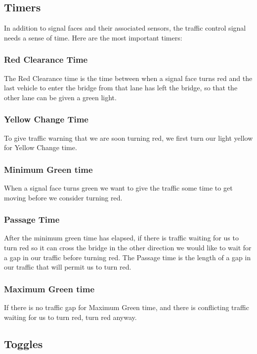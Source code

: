 \documentclass[letterpaper,twoside]{article}
\begin{document}
\subsection{Timers}

In addition to signal faces and their associated sensors, the
traffic control signal needs a sense of time.  Here are the most
important timers:

\subsubsection{Red Clearance Time}
The Red Clearance time is the time between when a signal face turns red
and the last vehicle to enter the bridge from that lane has left the
bridge, so that the other lane can be given a green light.

\subsubsection{Yellow Change Time}
To give traffic warning that we are soon turning red, we first turn our light
yellow for Yellow Change time.

\subsubsection{Minimum Green time}
When a signal face turns green we want to give the traffic some time
to get moving before we consider turning red.

\subsubsection{Passage Time}
After the minimum green time has elapsed, if there is traffic waiting for
us to turn red so it can cross the bridge in the other direction
we would like to wait for a gap in our traffic before turning red.
The Passage time is the length of a gap in our traffic that will permit us
to turn red.

\subsubsection{Maximum Green time}
If there is no traffic gap for Maximum Green time, and there is conflicting
traffic waiting for us to turn red, turn red anyway.

\subsection{Toggles}
\end{document}
